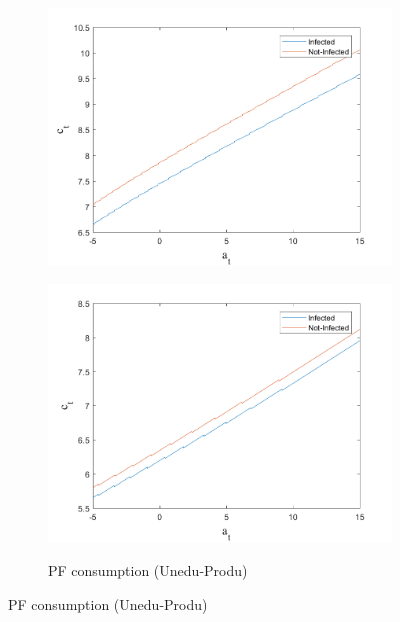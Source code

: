 \begin{figure}[H]
\begin{subfigure}{0.5\textwidth}
   \includegraphics[width=\linewidth,height = 0.22\textheight]{figures/mio/FIG8.png}
    \label{fig_dert}
\end{subfigure}
\hspace*{\fill}
\begin{subfigure}{0.5\textwidth}\caption{PF consumption (Unedu-Produ)}
   \includegraphics[width=\linewidth,height = 0.22\textheight]{figures/mio/FIG7.png}
    \label{fig:x_b}
\end{subfigure}
\hspace*{\fill}
\label{lafigura2}
\end{figure}
\newpage
